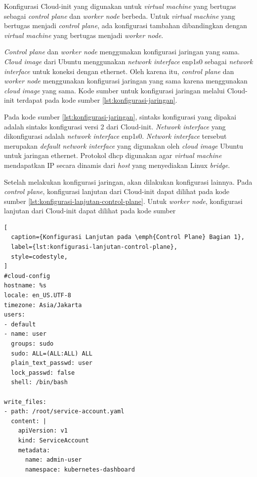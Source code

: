 Konfigurasi Cloud-init yang digunakan untuk \emph{virtual machine} yang bertugas sebagai \emph{control plane}
dan \emph{worker node} berbeda. Untuk \emph{virtual machine} yang bertugas menjadi \emph{control plane},
ada konfigurasi tambahan dibandingkan dengan \emph{virtual machine} yang bertugas menjadi \emph{worker node}.

\emph{Control plane} dan \emph{worker node} menggunakan konfigurasi jaringan yang sama. \emph{Cloud image}
dari Ubuntu menggunakan \emph{network interface} enp1s0 sebagai \emph{network interface} untuk
koneksi dengan ethernet. Oleh karena itu, \emph{control plane} dan \emph{worker node} menggunakan
konfigurasi jaringan yang sama karena menggunakan \emph{cloud image} yang sama. Kode sumber untuk
konfigurasi jaringan melalui Cloud-init terdapat pada kode sumber \ref{lst:konfigurasi-jaringan}.



Pada kode sumber \ref{lst:konfigurasi-jaringan}, sintaks konfigurasi yang dipakai adalah sintaks
konfigurasi versi 2 dari Cloud-init. \emph{Network interface} yang dikonfigurasi adalah \emph{network interface}
enp1s0. \emph{Network interface} tersebut merupakan \emph{default network interface} yang digunakan
oleh \emph{cloud image} Ubuntu untuk jaringan ethernet. Protokol dhcp digunakan agar \emph{virtual machine} mendapatkan
IP secara dinamis dari \emph{host} yang menyediakan Linux \emph{bridge}.

Setelah melakukan konfigurasi jaringan, akan dilakukan konfigurasi lainnya.
Pada \emph{control plane}, konfigurasi lanjutan dari Cloud-init dapat dilihat 
pada kode sumber \ref{lst:konfigurasi-lanjutan-control-plane}.
Untuk \emph{worker node}, konfigurasi lanjutan dari Cloud-init dapat dilihat
pada kode sumber

\begin{lstlisting}[
  caption={Konfigurasi Lanjutan pada \emph{Control Plane} Bagian 1},
  label={lst:konfigurasi-lanjutan-control-plane},
  style=codestyle,
]
#cloud-config
hostname: %s
locale: en_US.UTF-8
timezone: Asia/Jakarta
users:
- default
- name: user
  groups: sudo
  sudo: ALL=(ALL:ALL) ALL
  plain_text_passwd: user
  lock_passwd: false
  shell: /bin/bash

write_files:
- path: /root/service-account.yaml
  content: |
    apiVersion: v1
    kind: ServiceAccount
    metadata:
      name: admin-user
      namespace: kubernetes-dashboard
\end{lstlisting}

